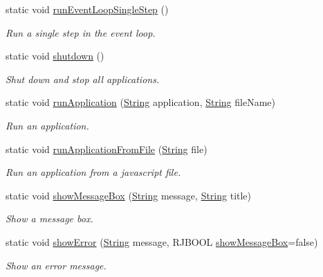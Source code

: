 \begin{DoxyCompactItemize}
static void \mbox{\hyperlink{class_rad_j_a_v_1_1_rad_jav_a59eb027192379f310cbc66db108b075f}{run\+Event\+Loop\+Single\+Step}} ()
\begin{DoxyCompactList}\small\item\em Run a single step in the event loop. \end{DoxyCompactList}\item 
static void \mbox{\hyperlink{class_rad_j_a_v_1_1_rad_jav_a6dabcf8258dfb10b1c9a785e20add79c}{shutdown}} ()
\begin{DoxyCompactList}\small\item\em Shut down and stop all applications. \end{DoxyCompactList}\item 
static void \mbox{\hyperlink{class_rad_j_a_v_1_1_rad_jav_a7e80e2833cf8f3e223659f0ef3f270ab}{run\+Application}} (\mbox{\hyperlink{class_rad_j_a_v_1_1_string}{String}} application, \mbox{\hyperlink{class_rad_j_a_v_1_1_string}{String}} file\+Name)
\begin{DoxyCompactList}\small\item\em Run an application. \end{DoxyCompactList}\item 
static void \mbox{\hyperlink{class_rad_j_a_v_1_1_rad_jav_a293b050fb802c1d1c1112895388c9c7c}{run\+Application\+From\+File}} (\mbox{\hyperlink{class_rad_j_a_v_1_1_string}{String}} file)
\begin{DoxyCompactList}\small\item\em Run an application from a javascript file. \end{DoxyCompactList}\item 
static void \mbox{\hyperlink{class_rad_j_a_v_1_1_rad_jav_a70ed4cb4f4b341770046193fcf5118dd}{show\+Message\+Box}} (\mbox{\hyperlink{class_rad_j_a_v_1_1_string}{String}} message, \mbox{\hyperlink{class_rad_j_a_v_1_1_string}{String}} title)
\begin{DoxyCompactList}\small\item\em Show a message box. \end{DoxyCompactList}\item 
static void \mbox{\hyperlink{class_rad_j_a_v_1_1_rad_jav_ab91e1d55577183ed105e393c06df6374}{show\+Error}} (\mbox{\hyperlink{class_rad_j_a_v_1_1_string}{String}} message, R\+J\+B\+O\+OL \mbox{\hyperlink{class_rad_j_a_v_1_1_rad_jav_a70ed4cb4f4b341770046193fcf5118dd}{show\+Message\+Box}}=false)
\begin{DoxyCompactList}\small\item\em Show an error message. \end{DoxyCompactList}\item 

\end{DoxyCompactItemize}
